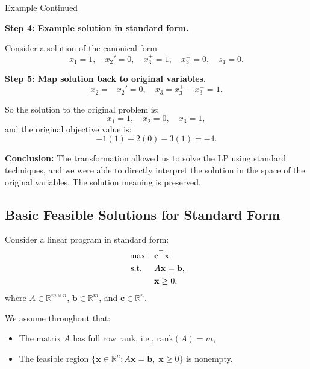 \begin{example}{Example Continued}
\medskip

\textbf{Step 4: Example solution in standard form.}

Consider a solution of the canonical form
\[
x_1 = 1, \quad x_2' = 0, \quad x_3^+ = 1, \quad x_3^- = 0, \quad s_1 = 0.
\]

\textbf{Step 5: Map solution back to original variables.}
\[
x_2 = -x_2' = 0, \quad x_3 = x_3^+ - x_3^- = 1.
\]

So the solution to the original problem is:
\[
x_1 = 1, \quad x_2 = 0, \quad x_3 = 1,
\]
and the original objective value is:
\[
-1(1) + 2(0) - 3(1) = -4.
\]

\medskip

\textbf{Conclusion:} The transformation allowed us to solve the LP using standard techniques, and we were able to directly interpret the solution in the space of the original variables. The solution meaning is preserved.
\end{example}

\subsection{Basic Feasible Solutions for Standard Form}

Consider a linear program in standard form:
\[
\begin{aligned}
\max \quad & \mathbf{c}^\top \mathbf{x} \\
\text{ s.t. } \quad & A \mathbf{x} = \mathbf{b}, \\
& \mathbf{x} \geq 0,
\end{aligned}
\]
where \( A \in \mathbb{R}^{m \times n} \), \( \mathbf{b} \in \mathbb{R}^m \), and \( \mathbf{c} \in \mathbb{R}^n \).

\smallskip

We assume throughout that:
\begin{itemize}
    \item The matrix \( A \) has full row rank, i.e., \( \text{rank}(A) = m \),
    \item The feasible region \( \{ \mathbf{x} \in \mathbb{R}^n : A\mathbf{x} = \mathbf{b}, \; \mathbf{x} \geq 0 \} \) is nonempty.
\end{itemize}

\smallskip

